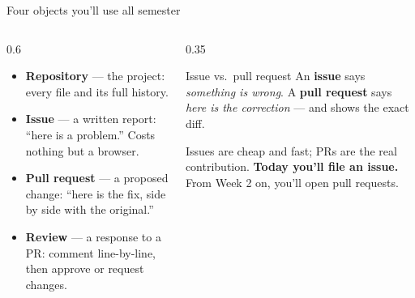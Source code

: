 \documentclass[9pt,aspectratio=169]{beamer}
\begin{document}
\begin{frame}{Four objects you'll use all semester}
    \begin{columns}[T]
        \begin{column}{0.6\textwidth}
            \begin{itemize}
                \item \textbf{Repository} --- the project: every file and its full history.
                \smallskip
                \item \textbf{Issue} --- a written report: ``here is a problem.'' Costs nothing but a browser.
                \smallskip
                \item \textbf{Pull request} --- a proposed change: ``here is the fix, side by side with the original.''
                \smallskip
                \item \textbf{Review} --- a response to a PR: comment line-by-line, then approve or request changes.
            \end{itemize}
        \end{column}
        \begin{column}{0.35\textwidth}
            \begin{block}{Issue vs.\ pull request}
                \footnotesize An \textbf{issue} says \textit{something is wrong}. A \textbf{pull request} says \textit{here is the correction} --- and shows the exact diff.
                \smallskip

                Issues are cheap and fast; PRs are the real contribution. \textbf{Today you'll file an issue.} From Week 2 on, you'll open pull requests.
            \end{block}
        \end{column}
    \end{columns}
\end{frame}
\end{document}
